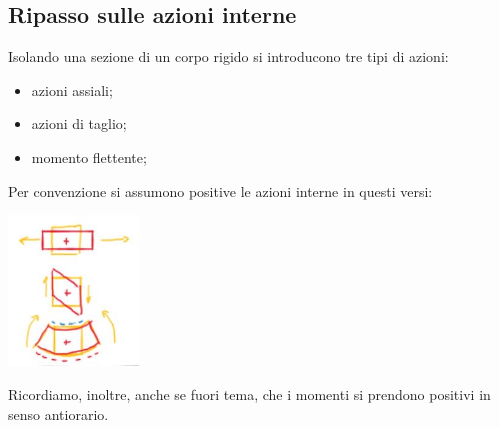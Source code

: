 \subsection{Ripasso sulle azioni interne}
Isolando una sezione di un corpo rigido si introducono tre tipi di azioni:
\begin{itemize}
    \item azioni assiali;
    \item azioni di taglio;
    \item momento flettente;
\end{itemize}
Per convenzione si assumono positive le azioni interne in questi versi:
\begin{center}
    \includegraphics[height=4cm]{../esercitazione5/img1.JPG}
\end{center}
Ricordiamo, inoltre, anche se fuori tema, che i momenti si prendono positivi in senso antiorario.